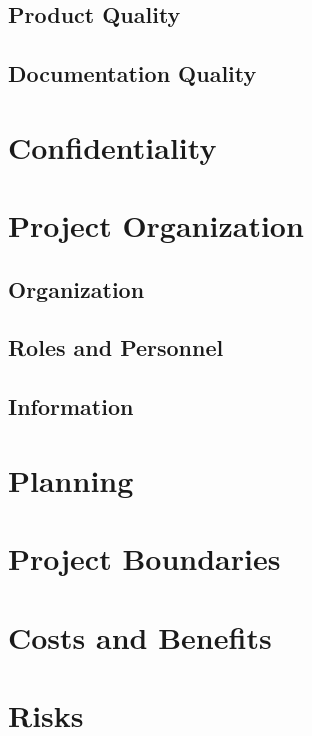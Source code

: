 \documentclass{article}
\begin{document}
\subsection{Product Quality}
\subsection{Documentation Quality}


\newpage

\section{Confidentiality}


\newpage

\section{Project Organization}
\subsection{Organization}
\subsection{Roles and Personnel}
\subsection{Information}


\newpage

\section{Planning}


\newpage

\section{Project Boundaries}


\newpage

\section{Costs and Benefits}


\newpage

\section{Risks}
\end{document}
